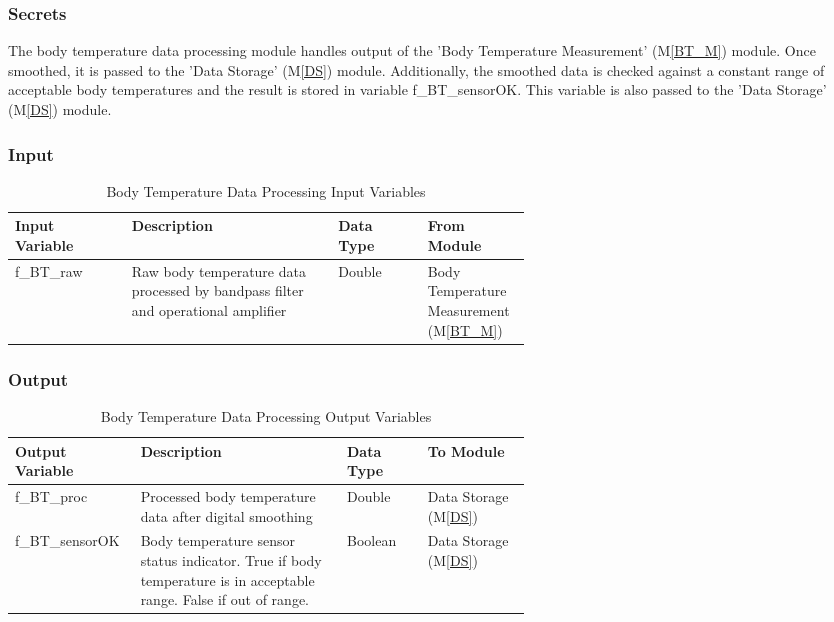 \documentclass{article}
\begin{document}
\begin{description}
        \subsubsection{Secrets}
        The body temperature data processing module handles output of the  'Body Temperature Measurement' (M\ref{BT_M}) module.  Once smoothed, it is passed to the 'Data Storage' (M\ref{DS}) module.  Additionally, the smoothed data is checked against a constant range of acceptable body temperatures and the result is stored in variable f\_BT\_sensorOK.  This variable is also passed to the 'Data Storage' (M\ref{DS}) module.
        
        \subsubsection{Input}
            \begin{longtable}{|l|p{0.4\linewidth}|l|p{0.2\linewidth}|}
            \caption{Body Temperature Data Processing Input Variables}
            \hline
            \textbf{Input Variable} & \textbf{Description} & \textbf {Data Type} & \textbf{From Module} \\
            \endhead
            \hline
            f\_BT\_raw & Raw body temperature data processed by bandpass filter and operational amplifier & Double & Body Temperature Measurement (M\ref{BT_M})\\
            \hline
            \end{longtable}
        \newpage
        \subsubsection{Output}
            \begin{longtable}{|l|p{0.4\linewidth}|l|p{0.2\linewidth}|}
            \caption{Body Temperature Data Processing Output Variables}
            \hline
            \textbf{Output Variable} & \textbf{Description} & \textbf {Data Type} & \textbf{To Module} \\
            \endhead
            \hline
            f\_BT\_proc & Processed body temperature data after digital smoothing & Double & Data Storage (M\ref{DS})\\
            \hline
            f\_BT\_sensorOK & Body temperature sensor status indicator.  True if body temperature is in acceptable range.  False if out of range. & Boolean & Data Storage (M\ref{DS})\\
            \hline
            \end{longtable}

\end{description}
\end{document}
